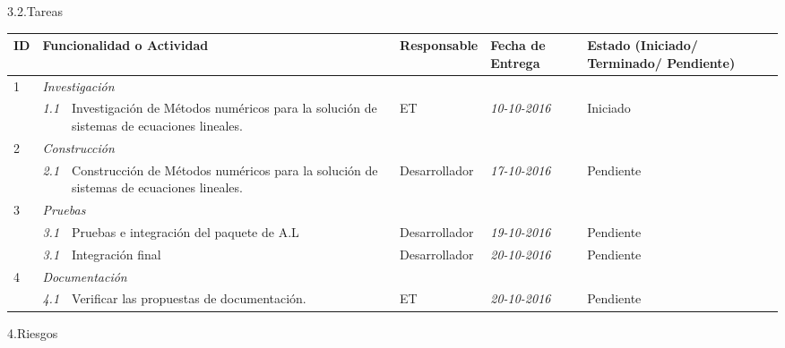 \documentclass[12pt]{report}
\numberwithin{equation}{section}
\begin{document}
\begin{flushleft}
\large{3.2.Tareas}\\
\begin{table}[H]
\centering
\begin{tabular}{|m{0.5cm}|m{0.7cm}|m{2.5cm}|m{3cm}|m{2.5cm}|m{2.5cm}|}
\hline
\textbf{ID} & \multicolumn{2}{|l|}{\textbf{Funcionalidad o Actividad}} & \textbf{Responsable} & \textbf{Fecha de Entrega} & \textbf{Estado (Iniciado/ Terminado/ Pendiente)}\\
\hline \hline
1 & \multicolumn{5}{|l|}{\textit{Investigaci\'on}}\\
\hline
  & \textit{1.1} & \small{Investigaci\'on de M\'etodos num\'ericos para la soluci\'on de sistemas de ecuaciones lineales.} & \small{ET} & \small{\textit{10-10-2016}} &  \small{Iniciado}\\ 
\hline
2 & \multicolumn{5}{|l|}{\textit{Construcci\'on}}\\
\hline
  & \textit{2.1} & \small{Construcci\'on de M\'etodos num\'ericos para la soluci\'on de sistemas de ecuaciones lineales.} &\small{Desarrollador} & \small{\textit{17-10-2016}} &  \small{Pendiente} \\ 
\hline
3 & \multicolumn{5}{|l|}{\textit{Pruebas}}\\
\hline
  & \textit{3.1} & \small{Pruebas e integraci\'on del paquete de A.L} & \small{Desarrollador} & \small{\textit{19-10-2016}} &  \small{Pendiente} \\ 
\hline
  & \textit{3.1} & \small{Integraci\'on final} & \small{Desarrollador} & \small{\textit{20-10-2016}} &  \small{Pendiente} \\ 
\hline
4 & \multicolumn{5}{|l|}{\textit{Documentaci\'on}}\\
\hline
  & \textit{4.1} & \small{Verificar las propuestas de documentaci\'on.} & \small{ET} & \small{\textit{20-10-2016}} &  \small{Pendiente} \\ 
\hline

\end{tabular}

\end{table}




\large{4.Riesgos}\\



\end{flushleft}
\end{document}

